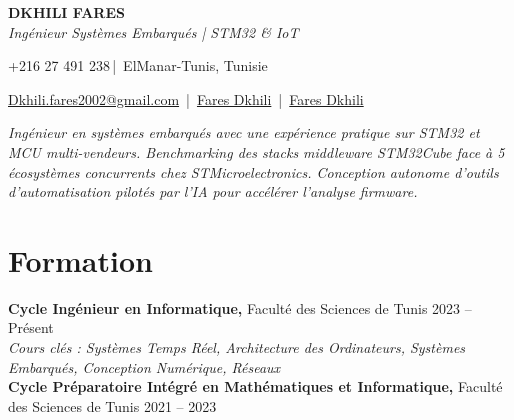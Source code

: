 \documentclass[a4paper,10pt]{article}
\newcommand{\socialicon}[1]{\raisebox{-0.05em}{\resizebox{!}{1em}{#1}}}
\newcommand{\headerfontiii}{\fontfamily{ppl}\selectfont} %
\begin{document}
\headerfontiii

\begin{center}
    {\Huge\textbf{DKHILI FARES}}\\[2mm]
    {\large\textit{Ing\'enieur Syst\`emes Embarqu\'es | STM32 \& IoT}}
\end{center}
\vspace{-4mm}

\begin{center}
    \small{
    +216 27 491 238\,|\ ElManar-Tunis, Tunisie
    }
\end{center}
\vspace{-6mm}
\vspace{2.2mm}
\begin{center}
    \small{
    \href{mailto:Dkhili.fares2002@gmail.com}{Dkhili.fares2002@gmail.com} \,|\,
    \socialicon{\faLinkedin}
    \href{https://www.linkedin.com/in/fares-dkhili-018b17303/}{Fares Dkhili} \,|\,
    \socialicon{\faGithub}
    \href{https://github.com/DkhiliFares}{Fares Dkhili}
    }
\end{center}
\vspace{-2mm}
\begin{center}
\small{\textit{Ing\'enieur en syst\`emes embarqu\'es avec une exp\'erience pratique sur STM32 et MCU multi-vendeurs. Benchmarking des stacks middleware STM32Cube face \`a 5 \'ecosyst\`emes concurrents chez STMicroelectronics. Conception autonome d'outils d'automatisation pilot\'es par l'IA pour acc\'el\'erer l'analyse firmware.}}
\end{center}


\section{\textbf{Formation}}
\noindent
\textbf{Cycle Ing\'enieur en Informatique,} Facult\'e des Sciences de Tunis \hfill 2023 -- Pr\'esent\\
\textit{\footnotesize{Cours cl\'es : Syst\`emes Temps R\'eel, Architecture des Ordinateurs, Syst\`emes Embarqu\'es, Conception Num\'erique, R\'eseaux}}\\
\textbf{Cycle Pr\'eparatoire Int\'egr\'e en Math\'ematiques et Informatique,} Facult\'e des Sciences de Tunis \hfill 2021 -- 2023
\end{document}
